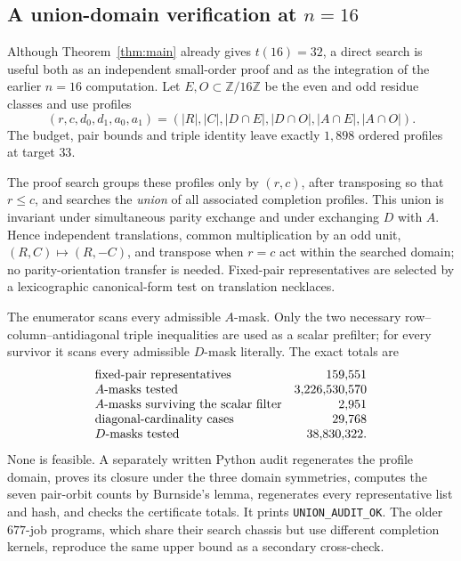 \documentclass[11pt]{amsart}
\theoremstyle{definition}
\theoremstyle{remark}
\newcommand{\Z}{\mathbb{Z}}
\newcommand{\bs}{\discretionary{}{}{}}
\begin{document}
\subsection{A union-domain verification at \texorpdfstring{$n=16$}{n=16}}
\label{ssec:t16}

Although Theorem~\ref{thm:main} already gives $t(16)=32$, a direct search is
useful both as an independent small-order proof and as the integration of the
earlier $n=16$ computation.  Let $E,O\subset\Z/16\Z$ be the even and odd
residue classes and use profiles
\[
(r,c,d_0,d_1,a_0,a_1)
=(|R|,|C|,|D\cap E|,|D\cap O|,|A\cap E|,|A\cap O|).
\]
The budget, pair bounds and triple identity leave exactly $1{,}898$ ordered
profiles at target $33$.

The proof search groups these profiles only by $(r,c)$, after transposing so
that $r\le c$, and searches the \emph{union} of all associated completion
profiles.  This union is invariant under simultaneous parity exchange and
under exchanging $D$ with $A$.  Hence independent translations, common
multiplication by an odd unit, $(R,C)\mapsto(R,-C)$, and transpose when
$r=c$ act within the searched domain; no parity-orientation transfer is
needed.  Fixed-pair representatives are selected by a lexicographic
canonical-form test on translation necklaces.

The enumerator scans every admissible $A$-mask.  Only the two necessary
row--column--antidiagonal triple inequalities are used as a scalar prefilter;
for every survivor it scans every admissible $D$-mask literally.  The exact
totals are
\[
\begin{array}{@{}lr@{}}
\text{fixed-pair representatives}&159{,}551\\
A\text{-masks tested}&3{,}226{,}530{,}570\\
A\text{-masks surviving the scalar filter}&2{,}951\\
\text{diagonal-cardinality cases}&29{,}768\\
D\text{-masks tested}&38{,}830{,}322 .
\end{array}
\]
None is feasible.  A separately written Python audit regenerates the profile
domain, proves its closure under the three domain symmetries, computes the
seven pair-orbit counts by Burnside's lemma, regenerates every representative
list and hash, and checks the certificate totals.  It prints
\texttt{UNION\_\bs{}AUDIT\_\bs{}OK}.  The older $677$-job programs, which
share their search chassis but use different completion kernels, reproduce
the same upper bound as a secondary cross-check.
\end{document}

